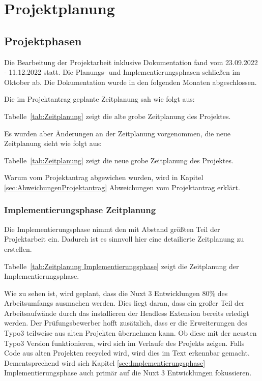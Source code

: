\section{Projektplanung} 
\label{sec:Projektplanung}


\subsection{Projektphasen}
\label{sec:Projektphasen}

Die Bearbeitung der Projektarbeit inklusive Dokumentation fand vom 23.09.2022 - 11.12.2022 statt. Die Planungs- und Implementierungsphasen schließen im Oktober ab. Die Dokumentation wurde in den folgenden Monaten abgeschlossen.

Die im Projektantrag geplante Zeitplanung sah wie folgt aus:

Tabelle~\ref{tab:Zeitplanung} zeigt die alte grobe Zeitplanung des Projektes.


Es wurden aber Änderungen an der Zeitplanung vorgenommen, die neue Zeitplanung sieht wie folgt aus:

Tabelle~\ref{tab:Zeitplanung} zeigt die neue grobe Zeitplanung des Projektes.

Warum vom Projektantrag abgewichen wurden, wird in Kapitel \ref{sec:AbweichungenProjektantrag} Abweichungen vom Projektantrag erklärt.

\subsubsection{Implementierungsphase Zeitplanung}
\label{sec:Implementierungsphase Zeitplanung}

Die Implementierungsphase nimmt den mit Abstand größten Teil der Projektarbeit ein. Dadurch ist es sinnvoll hier eine detailierte Zeitplanung zu erstellen.

Tabelle~\ref{tab:Zeitplanung Implementierungsphase} zeigt die Zeitplanung der Implementierungsphase.

Wie zu sehen ist, wird geplant, dass die Nuxt 3 Entwicklungen 80\% des Arbeitsumfangs ausmachen werden. Dies liegt daran, dass ein großer Teil der Arbeitsaufwände durch das installieren der Headless Extension bereits erledigt werden. Der Prüfungsbewerber hofft zusätzlich, dass er die Erweiterungen des Typo3 teilweise aus alten Projekten übernehmen kann. Ob diese mit der neusten Typo3 Version funktionieren, wird sich im Verlaufe des Projekts zeigen. Falls Code aus alten Projekten recycled wird, wird dies im Text erkennbar gemacht. Dementsprechend wird sich Kapitel \ref{sec:Implementierungsphase} Implementierungsphase auch primär auf die Nuxt 3 Entwicklungen fokussieren.

